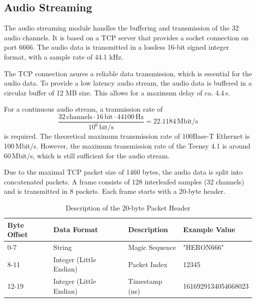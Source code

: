 \subsection{Audio Streaming}
The audio streaming module handles the buffering and transmission of the 32 audio channels.
It is based on a TCP server that provides a socket connection on port 6666.
The audio data is transmitted in a lossless 16-bit signed integer format, with a sample rate of 44.1 kHz.

The TCP connection asures a reliable data transmission, which is essential for the audio data.
To provide a low latency audio stream, the audio data is buffered in a circular buffer of 12 MB size.
This allows for a maximum delay of ca. 4.4\,s.

For a continuous audio stream, a tranmission rate of
\begin{equation}
	\frac{32\,\text{channels} \cdot 16\,\text{bit} \cdot 44100\,\text{Hz}}{10^6\,\text{bit/s}} = 22.1184\,\text{Mbit/s}
\end{equation}
is required.
The theoretical maximum transmission rate of 100Base-T Ethernet is 100\,Mbit/s.
However, the maximum transmission rate of the Teensy 4.1 is around 60\,Mbit/s, which is still sufficient for the audio stream.

Due to the maximal TCP packet size of 1460 bytes, the audio data is split into concatenated packets.
A frame consists of 128 interleafed samples (32 channels) and is transmitted in 8 packets.
Each frame starts with a 20-byte header.

\begin{table}[h]
	\centering
	\begin{tabular}{|l|l|l|l|}
		\hline
		\textbf{Byte Offset} & \textbf{Data Format}    & \textbf{Description} & \textbf{Example Value} \\ \hline
		0-7                  & String                  & Magic Sequence       & "HERON666"             \\ \hline
		8-11                 & Integer (Little Endian) & Packet Index         & 12345                  \\ \hline
		12-19                & Integer (Little Endian) & Timestamp (ns)       & 1616929134054668023    \\ \hline
	\end{tabular}
	\caption{Description of the 20-byte Packet Header}
	\label{tab:packet_header}
\end{table}

